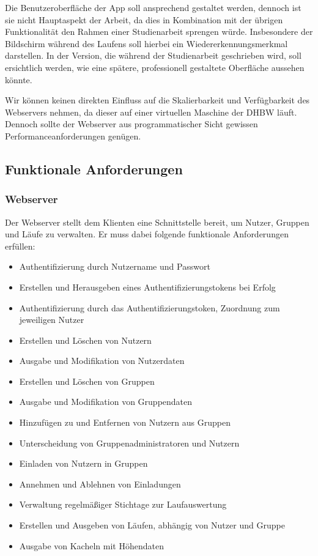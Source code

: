 Die Benutzeroberfläche der App soll ansprechend gestaltet werden, dennoch ist sie nicht Hauptaspekt der Arbeit, da dies in Kombination mit der übrigen Funktionalität den Rahmen einer Studienarbeit sprengen würde. Insbesondere der Bildschirm während des Laufens soll hierbei ein Wiedererkennungsmerkmal darstellen. In der Version, die während der Studienarbeit geschrieben wird, soll ersichtlich werden, wie eine spätere, professionell gestaltete Oberfläche aussehen könnte.

Wir können keinen direkten Einfluss auf die Skalierbarkeit und Verfügbarkeit des Webservers nehmen, da dieser auf einer virtuellen Maschine der DHBW läuft. Dennoch sollte der Webserver aus programmatischer Sicht gewissen Performanceanforderungen genügen.
\subsection{Funktionale Anforderungen}
\subsubsection{Webserver}
Der Webserver stellt dem Klienten eine Schnittstelle bereit, um Nutzer, Gruppen und Läufe zu verwalten. Er muss dabei folgende funktionale Anforderungen erfüllen:
\begin{itemize}
\item Authentifizierung durch Nutzername und Passwort
\item Erstellen und Herausgeben eines Authentifizierungstokens bei Erfolg
\item Authentifizierung durch das Authentifizierungstoken, Zuordnung zum jeweiligen Nutzer
\item Erstellen und Löschen von Nutzern
\item Ausgabe und Modifikation von Nutzerdaten
\item Erstellen und Löschen von Gruppen
\item Ausgabe und Modifikation von Gruppendaten
\item Hinzufügen zu und Entfernen von Nutzern aus Gruppen
\item Unterscheidung von Gruppenadministratoren und Nutzern
\item Einladen von Nutzern in Gruppen
\item Annehmen und Ablehnen von Einladungen
\item Verwaltung regelmäßiger Stichtage zur Laufauswertung
\item Erstellen und Ausgeben von Läufen, abhängig von Nutzer und Gruppe
\item Ausgabe von Kacheln mit Höhendaten
\end{itemize}
